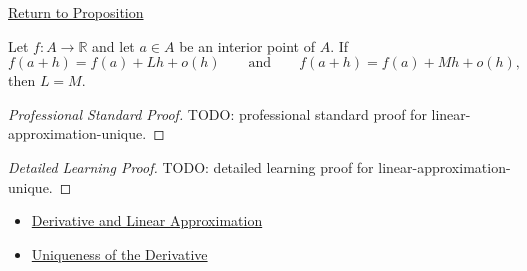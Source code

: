 \newpage
{}
\label{prf:linear-approximation-unique}

\begin{remark*}[Return]
\hyperref[prop:linear-approximation-unique]{Return to Proposition}
\end{remark*}

\begin{proposition*}
Let $f:A\to\mathbb{R}$ and let $a\in A$ be an interior point of $A$. If
\[
  f(a+h)=f(a)+Lh+o(h)
  \qquad\text{and}\qquad
  f(a+h)=f(a)+Mh+o(h),
\]
then $L=M$.
\end{proposition*}

\begin{proof}[Professional Standard Proof]
\LRAProofBodyStart
TODO: professional standard proof for linear-approximation-unique.
\end{proof}

\begin{proof}[Detailed Learning Proof]
\LRAProofBodyStart
TODO: detailed learning proof for linear-approximation-unique.
\end{proof}

\begin{remark*}
\end{remark*}

\begin{dependencies}
\begin{itemize}
  \item \hyperref[thm:derivative-linear-approximation-equivalence]{Derivative and Linear Approximation}
  \item \hyperref[thm:uniqueness-of-the-derivative]{Uniqueness of the Derivative}
\end{itemize}
\end{dependencies}

\clearpage
